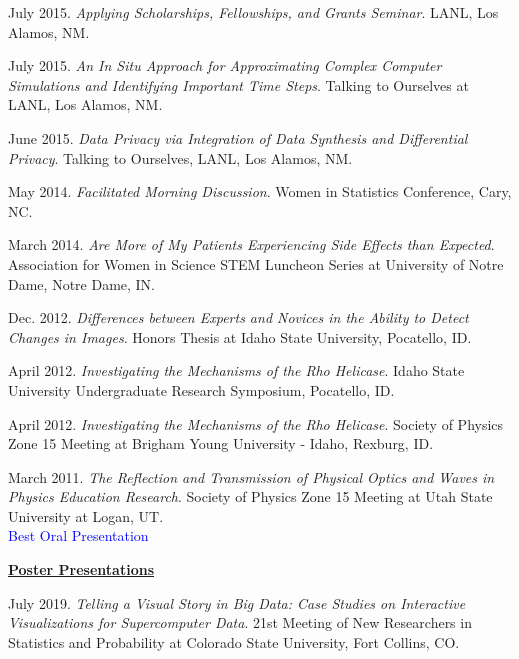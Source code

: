 \begin{etaremune}[topsep=0pt, itemsep=4pt, partopsep=0pt, parsep=0pt]
    \item July 2015. \textit{Applying Scholarships, Fellowships, and Grants Seminar}. LANL, Los Alamos, NM.
    
    \item July 2015. \textit{An In Situ Approach for Approximating Complex Computer Simulations and Identifying Important Time Steps}. Talking to Ourselves at LANL, Los Alamos, NM.
    
    \item June 2015. \textit{Data Privacy via Integration of Data Synthesis and Differential Privacy}. Talking to Ourselves, LANL, Los Alamos, NM. 
    
    \item May 2014. \textit{Facilitated Morning Discussion}. Women in Statistics Conference, Cary, NC.
    
    \item March 2014. \textit{Are More of My Patients Experiencing Side Effects than Expected}. Association for Women in Science STEM Luncheon Series at University of Notre Dame, Notre Dame, IN.
    
    \item Dec. 2012. \textit{Differences between Experts and Novices in the Ability to Detect Changes in Images}. Honors Thesis at Idaho State University, Pocatello, ID.
    
    \item April 2012. \textit{Investigating the Mechanisms of the Rho Helicase}. Idaho State University Undergraduate Research Symposium, Pocatello, ID.
    
    \item April 2012. \textit{Investigating the Mechanisms of the Rho Helicase}. Society of Physics Zone 15 Meeting at Brigham Young University - Idaho, Rexburg, ID.
    
    \item March 2011. \textit{The Reflection and Transmission of Physical Optics and Waves in Physics Education Research}. Society of Physics Zone 15 Meeting at Utah State University at Logan, UT.\\
    \textcolor{blue}{Best Oral Presentation}
  
\vspace{8pt}
\hspace{-0.30in}\underline{\textbf{\large Poster Presentations}}\normalsize
    \item July 2019. \textit{Telling a Visual Story in Big Data: Case Studies on Interactive Visualizations for Supercomputer Data}. 21st Meeting of New Researchers in Statistics and Probability at Colorado State University, Fort Collins, CO.
    

\end{etaremune}
